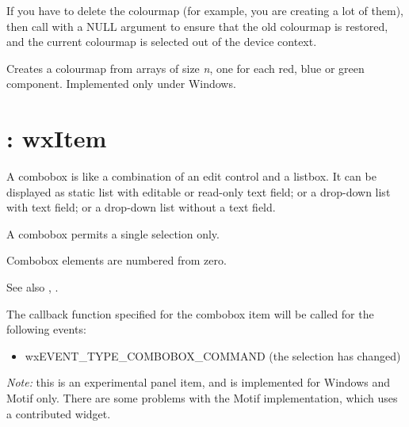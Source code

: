 If you have to delete the colourmap (for example, you are creating a lot of
them), then call  with a NULL argument
to ensure that the old colourmap is restored, and the current colourmap is selected
out of the device context.



Creates a colourmap from arrays of size {\it n}, one for each
red, blue or green component. Implemented only under Windows.



\section{: wxItem}\label{wxcombobox}

A combobox is like a combination of an edit control and a listbox. It can be
displayed as static list with editable or read-only text field; or a drop-down list with
text field; or a drop-down list without a text field.

A combobox permits a single selection only.

Combobox elements are numbered from zero.

See also , .

The callback function specified for the combobox item will be called
for the following events:

\begin{itemize}\itemsep=0pt
\item wxEVENT\_TYPE\_COMBOBOX\_COMMAND (the selection has changed)
\end{itemize}

{\it Note:} this is an experimental panel item, and is implemented for Windows and Motif only. There
are some problems with the Motif implementation, which uses a contributed widget.

\label{constrcombobox}

